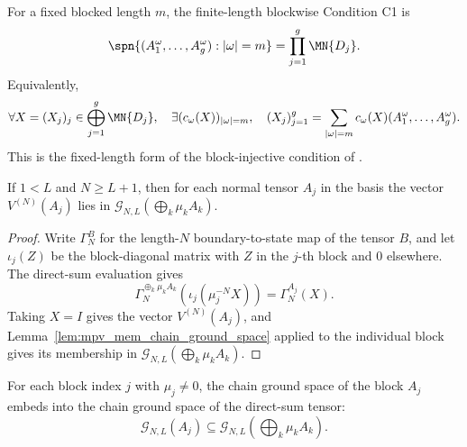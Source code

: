 \begin{definition}
    \label{def:blockwise_product_word_span}
    \leanok
    For a fixed blocked length $m$, the finite-length blockwise Condition C1 is
    \[
        \spn\{(A_1^\omega,\ldots,A_g^\omega): |\omega|=m\}
        =
        \prod_{j=1}^g \MN{D_j}.
    \]
    Equivalently,
    \[
        \forall X=(X_j)_j\in\bigoplus_{j=1}^g \MN{D_j},
        \quad
        \exists (c_\omega(X))_{|\omega|=m},
        \quad
        (X_j)_{j=1}^g
        =
        \sum_{|\omega|=m} c_\omega(X)(A_1^\omega,\ldots,A_g^\omega).
    \]
    This is the fixed-length form of the block-injective condition of
    \cite[lines~2113--2117]{Cirac2021Matrix}.
\end{definition}

\begin{lemma}
    \label{lem:bnt_mpv_mem_ground_space}
    \notready
    If $1 < L$ and $N \ge L + 1$, then for each normal tensor $A_j$ in the basis
    the vector $V^{(N)}(A_j)$ lies in
    $\mathcal G_{N,L}(\bigoplus_k \mu_k A_k)$.
\end{lemma}

\begin{proof}
    \notready
    Write $\Gamma_N^B$ for the length-$N$ boundary-to-state map of the tensor
    $B$, and let $\iota_j(Z)$ be the block-diagonal matrix with $Z$ in the
    $j$-th block and $0$ elsewhere. The direct-sum evaluation gives
    \[
        \Gamma_N^{\oplus_k\mu_k A_k}\!\left(\iota_j(\mu_j^{-N}X)\right)
        =
        \Gamma_N^{A_j}(X).
    \]
    Taking $X=I$ gives the vector $V^{(N)}(A_j)$, and
    Lemma~\ref{lem:mpv_mem_chain_ground_space} applied to the individual block
    gives its membership in $\mathcal G_{N,L}(\bigoplus_k\mu_k A_k)$.
\end{proof}

\begin{lemma}
    \label{lem:chain_ground_space_block_le_assembled}
    \leanok
    For each block index $j$ with $\mu_{j} \neq 0$, the chain ground space of the block
    $A_j$ embeds into the chain ground space of the direct-sum tensor:
    \[
        \mathcal G_{N,L}(A_{j})
        \subseteq
        \mathcal G_{N,L}\!\left(\bigoplus_k \mu_k A_k\right).
    \]
\end{lemma}

